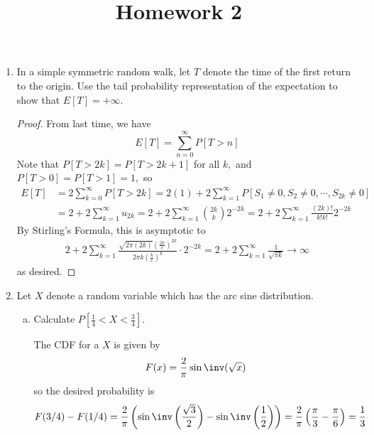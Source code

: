 \documentclass{article}
\begin{document}
\title{Homework 2}
\maketitle
\thispagestyle{fancy}

\begin{enumerate}[(1)] 
	\item In a simple symmetric random walk, let $T$ denote the time of the first return to the origin. Use the tail probability representation of the expectation to show that $E[T]=+\infty.$
		\begin{proof}
			From last time, we have
			\[E[T] = \sum_{n=0}^{\infty}P[T>n]\]
			Note that $P[T>2k] = P[T> 2k+1]$ for all $k,$ and $P[T>0]=P[T>1]=1,$ so
			\begin{align*}
				E[T]&=2\sum_{k=0}^{\infty}P[T> 2k]=2(1)+2\sum_{k=1}^{\infty}P[S_1\neq 0, S_2\neq 0, \cdots, S_{2k}\neq0] \\
				&= 2+2\sum_{k=1}^{\infty}u_{2k} = 2+2\sum_{k=1}^{\infty} \binom{2k}{k}2^{-2k} = 2+2\sum_{k=1}^{\infty}\frac{(2k)!}{k!k!}2^{-2k}
			\end{align*}
			By Stirling's Formula, this is asymptotic to
			\begin{align*}
				2+2\sum_{k=1}^{\infty} \frac{\sqrt{2\pi (2k)}\left( \frac{2k}{e} \right)^{2k}}{2\pi k\left( \frac{k}{e} \right)^k}\cdot2^{-2k} = 2+2\sum_{k=1}^{\infty}\frac{1}{\sqrt{\pi k}}\to \infty
			\end{align*}
			as desired.
		\end{proof}

	\item Let $X$ denote a random variable which has the arc sine distribution.

		\begin{enumerate}[(a)]
			\item Calculate $P\left[ \frac{1}{4}<X<\frac{3}{4} \right].$ 
				\begin{soln}
					The CDF for a $X$ is given by
					\[F(x)=\frac{2}{\pi}\sin\inv(\sqrt{x})\]
					so the desired probability is
					\[F(3/4)-F(1/4) = \frac{2}{\pi}\left( \sin\inv\left( \frac{\sqrt{3}}{2} \right) - \sin\inv\left( \frac{1}{2} \right) \right) = \frac{2}{\pi} \left( \frac{\pi}{3} - \frac{\pi}{6} \right) = \frac{1}{3}\]
				\end{soln}


\end{enumerate}
\end{enumerate}
\end{document}
